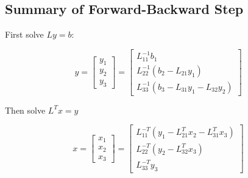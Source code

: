 \documentclass[
  letterpaper,
  DIV=11,
  numbers=noendperiod]{scrartcl}
\begin{document}
\subsection{Summary of Forward-Backward
Step}\label{summary-of-forward-backward-step}

First solve \(Ly = b\):

\[
y = \begin{bmatrix}
y_1 \\
y_2 \\
y_3
\end{bmatrix} =
\begin{bmatrix}
 L_{11}^{-1}b_1 \\
L_{22}^{-1}\left(b_2 - L_{21}y_1\right) \\
L_{33}^{-1}\left(b_3 - L_{31}y_1 - L_{32}y_2\right)
\end{bmatrix}
\]

Then solve \(L^Tx = y\)

\[
x = \begin{bmatrix}
x_1 \\
x_2 \\
x_3
\end{bmatrix} =
\begin{bmatrix}
L_{11}^{-T}\left(y_1 - L_{21}^Tx_2 - L_{31}^Tx_3\right) \\
L_{22}^{-T}\left(y_2 - L_{32}^Tx_3\right) \\
L_{33}^{-T}y_3
\end{bmatrix}
\]
\end{document}
